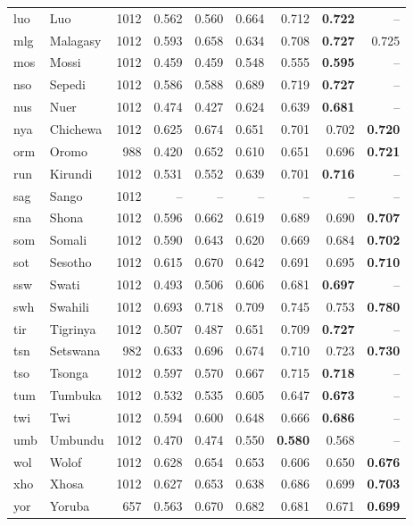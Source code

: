 \begin{table}[t]
\begin{tabular}{@{}llrrrrrrr@{}}
luo & Luo & 1012 & 0.562 & 0.560 & 0.664 & 0.712 & \textbf{0.722} & -- \\
mlg & Malagasy & 1012 & 0.593 & 0.658 & 0.634 & 0.708 & \textbf{0.727} & 0.725 \\
mos & Mossi & 1012 & 0.459 & 0.459 & 0.548 & 0.555 & \textbf{0.595} & -- \\
nso & Sepedi & 1012 & 0.586 & 0.588 & 0.689 & 0.719 & \textbf{0.727} & -- \\
nus & Nuer & 1012 & 0.474 & 0.427 & 0.624 & 0.639 & \textbf{0.681} & -- \\
nya & Chichewa & 1012 & 0.625 & 0.674 & 0.651 & 0.701 & 0.702 & \textbf{0.720} \\
orm & Oromo & 988 & 0.420 & 0.652 & 0.610 & 0.651 & 0.696 & \textbf{0.721} \\
run & Kirundi & 1012 & 0.531 & 0.552 & 0.639 & 0.701 & \textbf{0.716} & -- \\
sag & Sango & 1012 & -- & -- & -- & -- & -- & -- \\
sna & Shona & 1012 & 0.596 & 0.662 & 0.619 & 0.689 & 0.690 & \textbf{0.707} \\
som & Somali & 1012 & 0.590 & 0.643 & 0.620 & 0.669 & 0.684 & \textbf{0.702} \\
sot & Sesotho & 1012 & 0.615 & 0.670 & 0.642 & 0.691 & 0.695 & \textbf{0.710} \\
ssw & Swati & 1012 & 0.493 & 0.506 & 0.606 & 0.681 & \textbf{0.697} & -- \\
swh & Swahili & 1012 & 0.693 & 0.718 & 0.709 & 0.745 & 0.753 & \textbf{0.780} \\
tir & Tigrinya & 1012 & 0.507 & 0.487 & 0.651 & 0.709 & \textbf{0.727} & -- \\
tsn & Setswana & 982 & 0.633 & 0.696 & 0.674 & 0.710 & 0.723 & \textbf{0.730} \\
tso & Tsonga & 1012 & 0.597 & 0.570 & 0.667 & 0.715 & \textbf{0.718} & -- \\
tum & Tumbuka & 1012 & 0.532 & 0.535 & 0.605 & 0.647 & \textbf{0.673} & -- \\
twi & Twi & 1012 & 0.594 & 0.600 & 0.648 & 0.666 & \textbf{0.686} & -- \\
umb & Umbundu & 1012 & 0.470 & 0.474 & 0.550 & \textbf{0.580} & 0.568 & -- \\
wol & Wolof & 1012 & 0.628 & 0.654 & 0.653 & 0.606 & 0.650 & \textbf{0.676} \\
xho & Xhosa & 1012 & 0.627 & 0.653 & 0.638 & 0.686 & 0.699 & \textbf{0.703} \\
yor & Yoruba & 657 & 0.563 & 0.670 & 0.682 & 0.681 & 0.671 & \textbf{0.699} \\

\end{tabular}
\end{table}
